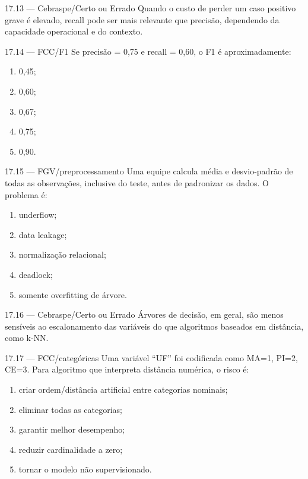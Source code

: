 \begin{questao}{ 17.13 — Cebraspe/Certo ou Errado}
Quando o custo de perder um caso positivo grave é elevado, recall pode ser mais relevante que precisão, dependendo da capacidade operacional e do contexto.
\end{questao}

\begin{questao}{ 17.14 — FCC/F1}
Se precisão = 0,75 e recall = 0,60, o F1 é aproximadamente:
\begin{enumerate}[label=\Alph*)]
\item 0,45;
\item 0,60;
\item 0,67;
\item 0,75;
\item 0,90.
\end{enumerate}
\end{questao}

\begin{questao}{ 17.15 — FGV/preprocessamento}
Uma equipe calcula média e desvio-padrão de todas as observações, inclusive do teste, antes de padronizar os dados. O problema é:
\begin{enumerate}[label=\Alph*)]
\item underflow;
\item data leakage;
\item normalização relacional;
\item deadlock;
\item somente overfitting de árvore.
\end{enumerate}
\end{questao}

\begin{questao}{ 17.16 — Cebraspe/Certo ou Errado}
Árvores de decisão, em geral, são menos sensíveis ao escalonamento das variáveis do que algoritmos baseados em distância, como k-NN.
\end{questao}

\begin{questao}{ 17.17 — FCC/categóricas}
Uma variável ``UF'' foi codificada como MA=1, PI=2, CE=3. Para algoritmo que interpreta distância numérica, o risco é:
\begin{enumerate}[label=\Alph*)]
\item criar ordem/distância artificial entre categorias nominais;
\item eliminar todas as categorias;
\item garantir melhor desempenho;
\item reduzir cardinalidade a zero;
\item tornar o modelo não supervisionado.
\end{enumerate}
\end{questao}

